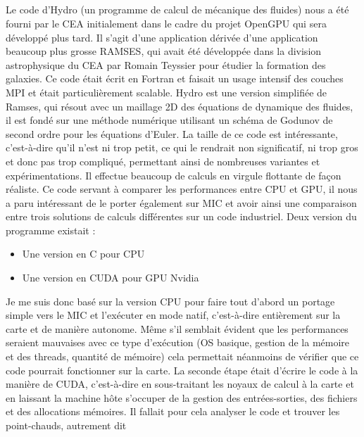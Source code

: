 \documentclass[11pt]{article}
\begin{document}
					\subparagraph{}
					Le code d'Hydro (un programme de calcul de mécanique des fluides) nous a été fourni par le CEA initialement 
					dans le cadre du projet OpenGPU qui sera développé plus tard. Il s'agit d'une application dérivée d'une 
					application beaucoup plus grosse RAMSES, qui avait été développée dans la division astrophysique du CEA 
					par Romain Teyssier pour étudier la formation des galaxies. Ce code était écrit en Fortran et faisait un 
					usage intensif des couches MPI et était particulièrement scalable. Hydro est une version simplifiée de 
					Ramses, qui résout avec un maillage 2D des équations de dynamique des fluides, il est fondé sur une 
					méthode numérique utilisant un schéma de Godunov de second ordre pour les équations d'Euler.
					La taille de ce code est intéressante, c'est-à-dire qu'il n'est ni trop petit, ce qui le rendrait non 
					significatif, ni trop gros et donc pas trop compliqué, permettant ainsi de nombreuses variantes et 
					expérimentations. Il effectue beaucoup de calculs en virgule flottante de façon réaliste. Ce code servant à 
					comparer les performances entre CPU et GPU, il nous a paru intéressant de le porter également sur 
					MIC et avoir ainsi une comparaison entre trois solutions de calculs différentes sur un code industriel. \newline
					Deux version du programme existait : \newline
					\begin{itemize}
					\item Une version en C pour CPU
					\item Une version en CUDA pour GPU Nvidia \newline
					\end{itemize}
					Je me suis donc basé sur la version CPU pour faire tout d'abord un portage simple vers le MIC et l'exécuter 
					en mode natif, c'est-à-dire entièrement sur la carte et de manière autonome. Même s'il semblait évident 
					que les performances seraient mauvaises avec ce type d'exécution (OS basique, gestion de la mémoire et des 
					threads, quantité de mémoire) cela permettait néanmoins de vérifier que ce code pourrait fonctionner sur la 
					carte. \newline
					La seconde étape était d'écrire le code à la manière de CUDA, c'est-à-dire en sous-traitant les noyaux de 
					calcul à la carte et en laissant la machine hôte s'occuper de la gestion des entrées-sorties, des fichiers et 
					des allocations mémoires. Il fallait pour cela analyser le code et trouver les point-chauds, autrement dit 
\end{document}
